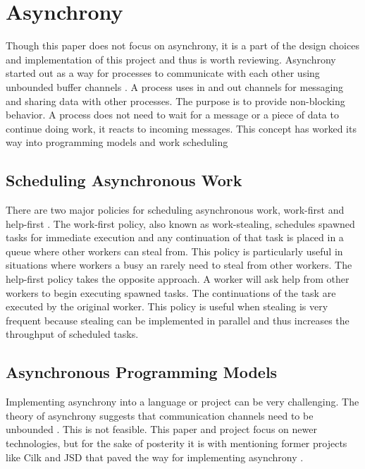 \section{Asynchrony}

Though this paper does not focus on asynchrony, it is a part of the design choices and implementation of this project and thus is worth reviewing. Asynchrony started out as a way for processes to communicate with each other using unbounded buffer channels \cite{Josephs1989}. A process uses in and out channels for messaging and sharing data with other processes. The purpose is to provide non-blocking behavior. A process does not need to wait for a message or a piece of data to continue doing work, it reacts to incoming messages. This concept has worked its way into programming models and work scheduling \cite{Guo2009}\cite{Leijen2009}\cite{syme2011f}

\subsection{Scheduling Asynchronous Work}

There are two major policies for scheduling asynchronous work, work-first and help-first \cite{Guo2009}. The work-first policy, also known as work-stealing, schedules spawned tasks for immediate execution and any continuation of that task is placed in a queue where other workers can steal from. This policy is particularly useful in situations where workers a busy an rarely need to steal from other workers. The help-first policy takes the opposite approach. A worker will ask help from other workers to begin executing spawned tasks. The continuations of the task are executed by the original worker. This policy is useful when stealing is very frequent because stealing can be implemented in parallel and thus increases the throughput of scheduled tasks.

\subsection{Asynchronous Programming Models}

Implementing asynchrony into a language or project can be very challenging. The theory of asynchrony suggests that communication channels need to be unbounded \cite{He1990}. This is not feasible. This paper and project focus on newer technologies, but for the sake of posterity it is with mentioning former projects like Cilk and JSD that paved the way for implementing asynchrony \cite{sutcliffe1988jackson}\cite{Cameron1986}\cite{Frigo1998}.

